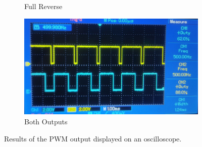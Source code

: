\begin{figure}
\begin{center}
\begin{subfigure}{0.47\linewidth}
			\caption{Full Reverse}
			\label{fig:4:OscTest:reverse}	
		\end{subfigure}
		\begin{subfigure}{0.47\linewidth}
			\includegraphics[width = \linewidth]{figures/PWMboth.jpg}
			\caption{Both Outputs}
			\label{fig:4:OscTest:both}	
		\end{subfigure}
		\caption{Results of the PWM output displayed on an oscilloscope.}
		\label{fig:4:OscTest}
	\end{center}
\end{figure} 
